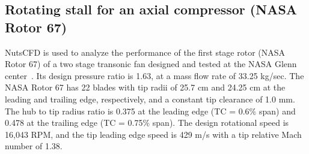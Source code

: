\documentclass[journal,final]{new-aiaa}
\begin{document}
%
%
%
%

\subsection{Rotating stall for an axial compressor  (NASA Rotor 67)}
NutsCFD is used to analyze the performance of the first
stage rotor (NASA Rotor 67) of a two stage transonic fan
designed and tested at the NASA Glenn center~\cite{strazisar1989laser}.
Its design pressure ratio is
1.63, at a mass flow rate of 33.25 kg/sec. 
The NASA Rotor 67 has 22 blades with tip radii of 25.7 cm
and 24.25 cm at the leading and trailing edge, respectively,
and a constant tip clearance of 1.0 mm. The hub to tip radius
ratio is 0.375 at the leading edge (TC = 0.6\% span) and 0.478
at the trailing edge (TC = 0.75\% span). The design rotational
speed is 16,043 RPM, and the tip leading edge speed is 429 m/s
with a tip relative Mach number of 1.38.
\end{document}
